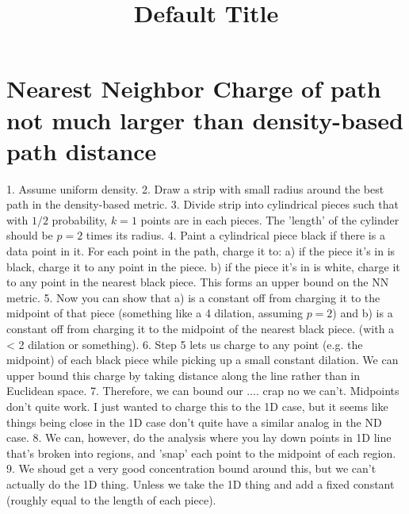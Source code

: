 \title{Default Title}


\section{Nearest Neighbor Charge of path not much larger than density-based path distance}
1. Assume uniform density. 
2. Draw a strip with small radius around the best path in the density-based metric.
3. Divide strip into cylindrical pieces such that with $1/2$ probability, $k=1$ points are in each pieces. The 'length' of the cylinder should be $p=2$ times its radius.
4. Paint a cylindrical piece black if there is a data point in it. For each point in the path, charge it to:
a) if the piece it's in is black, charge it to any point in the piece.
b) if the piece it's in is white, charge it to any point in the nearest black piece.
This forms an upper bound on the NN metric.
5. Now you can show that a) is a constant off from charging it to the midpoint of that piece (something like a 4 dilation, assuming $p=2$) and b) is a constant off from charging it to the midpoint of the nearest black piece. (with a < 2 dilation or something).
6.  Step 5 lets us charge to any point (e.g. the midpoint) of each black piece while picking up a small constant dilation. We can upper bound this charge by taking distance along the line rather than in Euclidean space.
7. Therefore, we can bound our .... crap  no we can't. Midpoints don't quite work. I just wanted to charge this to the 1D case, but it seems like things being close in the 1D case don't quite have a similar analog in the ND case.
8. We can, however, do the analysis where you lay down points in 1D line that's broken into regions, and 'snap' each point to the midpoint of each region.
9. We shoud get a very good concentration bound around this, but we can't actually do the 1D thing. Unless we take the 1D thing and add a fixed constant (roughly equal to the length of each piece).



